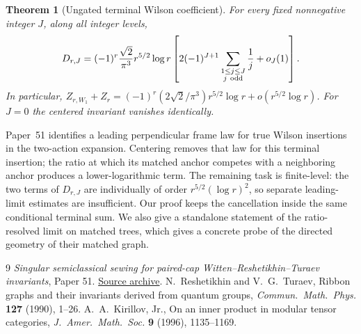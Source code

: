 \documentclass[11pt]{article}
\newtheorem{theorem}{Theorem}[section]
\begin{document}
\begin{theorem}[Ungated terminal Wilson coefficient]\label{thm:main}
For every fixed nonnegative integer \(J\), along all integer levels,
\[
 D_{r,J}=(-1)^r\frac{\sqrt2}{\pi^3}r^{5/2}\log r
   \left[2(-1)^{J+1}
             \sum_{\substack{1\le j\le J\\j\ {\rm odd}}}\frac1j
         +o_J(1)\right].
\]
In particular,
\(Z_{r,W_1}+Z_r=(-1)^r(2\sqrt2/\pi^3)r^{5/2}\log r+
o(r^{5/2}\log r)\).
For \(J=0\) the centered invariant vanishes identically.
\end{theorem}

Paper~51 identifies a leading perpendicular frame law for true Wilson insertions in the two-action expansion. Centering removes that law for this terminal insertion; the ratio at which its matched anchor competes with a neighboring anchor produces a lower-logarithmic term. The remaining task is finite-level: the two terms of \(D_{r,J}\) are individually of order \(r^{5/2}(\log r)^2\), so separate leading-limit estimates are insufficient. Our proof keeps the cancellation inside the same conditional terminal sum. We also give a standalone statement of the ratio-resolved limit on matched trees, which gives a concrete probe of the directed geometry of their matched graph.






\begin{thebibliography}{9}
\emph{Singular semiclassical sewing for paired-cap Witten--Reshetikhin--Turaev invariants}, Paper 51.
\href{https://github.com/g3173028019-beep/ai-automated-quantum-gravity-research/tree/main/papers/51-singular-wrt-semiclassical-sewing}{Source archive}.
N.~Reshetikhin and V.~G.~Turaev, Ribbon graphs and their invariants derived from quantum groups,
\emph{Commun.\ Math.\ Phys.} \textbf{127} (1990), 1--26.
A.~A.~Kirillov, Jr., On an inner product in modular tensor categories,
\emph{J.\ Amer.\ Math.\ Soc.} \textbf{9} (1996), 1135--1169.
\end{thebibliography}
\end{document}
